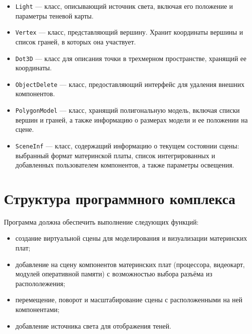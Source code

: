 \begin{itemize}[label=---]
	\item \texttt{Light} — класс, описывающий источник света, включая его положение и параметры теневой карты.
	
	\item \texttt{Vertex} — класс, представляющий вершину. Хранит координаты вершины и список граней, в которых она участвует.
	
	\item \texttt{Dot3D} — класс для описания точки в трехмерном пространстве, хранящий ее координаты.
	
	\item \texttt{ObjectDelete} — класс, предоставляющий интерфейс для удаления внешних компонентов.
	
	\item \texttt{PolygonModel} — класс, хранящий полигональную модель, включая списки вершин и граней, а также информацию о размерах модели и ее положении на сцене.
	
	\item \texttt{SceneInf} — класс, содержащий информацию о текущем состоянии сцены: выбранный формат материнской платы, список интегрированных и добавленных пользователем компонентов, а также параметры освещения.
\end{itemize}


\section{Структура программного комплекса}

Программа должна обеспечить выполнение следующих функций:
\begin{itemize}[label=---]
	\item создание виртуальной сцены для моделирования и визуализации материнских плат;
	\item добавление на сцену компонентов материнских плат (процессора, видеокарт, модулей оперативной памяти) с возможностью выбора разъёма из распололежения;
	\item перемещение, поворот и масштабирование сцены с расположенными на ней компонентами;
	\item добавление источника света для отображения теней.
\end{itemize}

